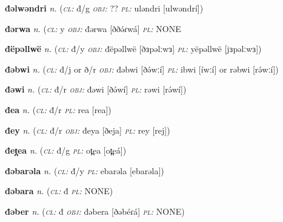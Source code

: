 \newentry
\headword\textbf{đəlwəndri}  
\ipa{[ðəlwəndrí]}
\synpos\textit{n.} 
\class(\textit{\textsc{cl:}} {đ/g}
\object\textit{\textsc{obj:}} ??
\plural\textit{\textsc{pl:}} uləndri [ulwəndrí])

\newentry
\headword\textbf{đərwa}  
\ipa{[ðə́ɾwá]}
\synpos\textit{n.} 
\class(\textit{\textsc{cl:}} {y}
\object\textit{\textsc{obj:}} đərwa [ððə́ɾwá]
\plural\textit{\textsc{pl:}} NONE


\newentry
\headword\textbf{đëpəllwë}  
\ipa{[ðɜpəlːwɜ]}
\synpos\textit{n.} 
\class(\textit{\textsc{cl:}} {đ/y}
\object\textit{\textsc{obj:}} đëpəllwë [ðɜpəlːwɜ]
\plural\textit{\textsc{pl:}} yëpəllwë [jɜpəlːwɜ])


\newentry
\headword\textbf{đəbwi}  
\ipa{[ðə́wːí]}
\synpos\textit{n.} 
\class(\textit{\textsc{cl:}} {đ/j or ð/r}
\object\textit{\textsc{obj:}} đəbwi [ðə́wːí]
\plural\textit{\textsc{pl:}} ibwi [íwːí] or rəbwi [rə́wːí])

\newentry
\headword\textbf{đəwi}  %
\ipa{[ðə́wí]}
\synpos\textit{n.} 
\class(\textit{\textsc{cl:}} {đ/r}
\object\textit{\textsc{obj:}} đəwi [ðə́wí]
\plural\textit{\textsc{pl:}} rəwi [rə́wí])

\newentry
\headword\textbf{đea}  
\ipa{[ðea]}
\synpos\textit{n.} 
\class(\textit{\textsc{cl:}} {đ/r}
\plural\textit{\textsc{pl:}} rea [rea])

\newentry
\headword\textbf{đey}  
\ipa{[ðej]}
\synpos\textit{n.} 
\class(\textit{\textsc{cl:}} {đ/r}
\object\textit{\textsc{obj:}} đeya [ðeja]
\plural\textit{\textsc{pl:}} rey [rej])

\newentry
\headword\textbf{đet̪ea}  
\ipa{[ðet̪eá]}
\synpos\textit{n.} 
\class(\textit{\textsc{cl:}} {đ/g}
\plural\textit{\textsc{pl:}} ot̪ea [ot̪eá])

\newentry
\headword\textbf{đəbarəla}  
\ipa{[ðəbarəla]}
\synpos\textit{n.} 
\class(\textit{\textsc{cl:}} {đ/y}
\plural\textit{\textsc{pl:}} ebarəla [ebarəla])

\newentry
\headword\textbf{đəbara}  
\ipa{[ðəbáɾá]}
\synpos\textit{n.} 
\class(\textit{\textsc{cl:}} {đ}
\plural\textit{\textsc{pl:}} NONE)

\newentry
\headword\textbf{đəber}  
\ipa{[ðəbér]}
\synpos\textit{n.} 
\class(\textit{\textsc{cl:}} {đ}
\object\textit{\textsc{obj:}} đəbera [ðəbéɾá]
\plural\textit{\textsc{pl:}} NONE)

